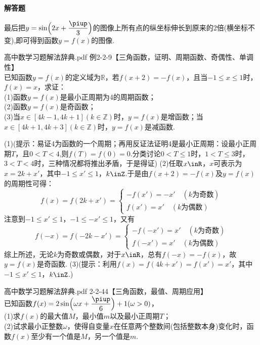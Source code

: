 \begin{exercise}{\bf 解答题}
\begin{answer}
        最后把$y=\sin \Bigl(2x+\dfrac{\piup}3\Bigr)$的图像上所有点的纵坐标伸长到原来的2倍(横坐标不变),即可得到函数$y=f(x)$的图像.
      \end{answer}
    \item 高中数学习题解法辞典.pdf 例2-2-9【三角函数，证明、周期函数、奇偶性、单调性】\\
      已知函数$y=f(x)$的定义域为$\mathbb{R}$，若$f(x+2)=-f(x)$，且当$-1\leqslant x\leqslant 1$时，$f(x)=x$，求证：\\
      (1)函数$y=f(x)$是最小正周期为4的周期函数；\\
      (2)函数$y=f(x)$是奇函数；\\
      (3)当$x\in[4k-1,4k+1](k\in\mathbb{Z})$时，$y=f(x)$是增函数；当$x\in[4k+1,4k+3](k\in\mathbb{Z})$时，$y=f(x)$是减函数.
      \begin{answer}
        (1)(提示：易证4为函数的一个周期；再用反证法证明4是最小正周期：设最小正周期$T$，且$0<T<4$,则$f(T)=f(0)=0$.分类讨论$0<T\leqslant 1$时，$1<T\leqslant 3$时，$3<T<4$时，三种情况都将推出矛盾，于是得证)
        (2)任取$x\inR$，$x$可表示为$x=2k+x'$，其中$-1\leqslant x'\leqslant 1$，$k\inZ$.于是由$f(x+2)=-f(x)$及$y=f(x)$的周期性可得：
        \[f(x)=f(2k+x')=
          \begin{cases}
            -f(x')=-x'\quad(k\text{为奇数})\\
            f(x')=x'\quad(k\text{为偶数})
          \end{cases}
        \]
        注意到$-1\leqslant x'\leqslant 1$，$-1\leqslant -x'\leqslant 1$，又有
        \[f(-x)=f(-2k-x')=
          \begin{cases}
            -f(-x')=x'\quad(k\text{为奇数})\\
            f(-x')=x'\quad(k\text{为偶数})
          \end{cases}
        \]
        综上所述，无论$k$为奇数或偶数，对于$x\inR$，总有$f(-x)=-f(x)$，故$y=f(x)$是奇函数.
        (3)(提示：利用$f(x)=f(4k+x')=f(x')=x'$，其中$-1\leqslant x'\leqslant 1$，$k\inZ$.)
      \end{answer}
    \item 高中数学习题解法辞典.pdf 2-2-44【三角函数，最值、周期应用】\\
      已知函数$f(x)=2\sin\Bigl(\omega x+\dfrac{\piup}6\Bigr)+1(\omega>0)$，\\
      (1)求$f(x)$的最大值$M$，最小值$m$以及最小正周期$T$；\\
      (2)试求最小正整数$\omega$，使得自变量$x$在任意两个整数间(包括整数本身)变化时，函数$f(x)$至少有一个值是$M$，另一个值是$m$.

\end{exercise}
